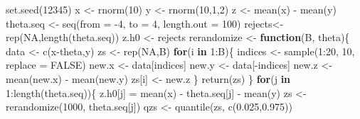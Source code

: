 \documentclass[
]{book}
\newenvironment{Shaded}{\begin{snugshade}}{\end{snugshade}}
\newcommand{\AttributeTok}[1]{\textcolor[rgb]{0.77,0.63,0.00}{#1}}
\newcommand{\ConstantTok}[1]{\textcolor[rgb]{0.00,0.00,0.00}{#1}}
\newcommand{\ControlFlowTok}[1]{\textcolor[rgb]{0.13,0.29,0.53}{\textbf{#1}}}
\newcommand{\DecValTok}[1]{\textcolor[rgb]{0.00,0.00,0.81}{#1}}
\newcommand{\FloatTok}[1]{\textcolor[rgb]{0.00,0.00,0.81}{#1}}
\newcommand{\FunctionTok}[1]{\textcolor[rgb]{0.00,0.00,0.00}{#1}}
\newcommand{\NormalTok}[1]{#1}
\newcommand{\OtherTok}[1]{\textcolor[rgb]{0.56,0.35,0.01}{#1}}
\newcommand{\SpecialCharTok}[1]{\textcolor[rgb]{0.00,0.00,0.00}{#1}}
\theoremstyle{definition}
\theoremstyle{definition}
\theoremstyle{definition}
\theoremstyle{definition}
\theoremstyle{remark}
\begin{document}
\begin{Shaded}
\begin{Highlighting}[]
\FunctionTok{set.seed}\NormalTok{(}\DecValTok{12345}\NormalTok{)}
\NormalTok{x }\OtherTok{\textless{}{-}} \FunctionTok{rnorm}\NormalTok{(}\DecValTok{10}\NormalTok{)}
\NormalTok{y }\OtherTok{\textless{}{-}} \FunctionTok{rnorm}\NormalTok{(}\DecValTok{10}\NormalTok{,}\DecValTok{1}\NormalTok{,}\DecValTok{2}\NormalTok{)}
\NormalTok{z }\OtherTok{\textless{}{-}} \FunctionTok{mean}\NormalTok{(x) }\SpecialCharTok{{-}} \FunctionTok{mean}\NormalTok{(y)}
\NormalTok{theta.seq }\OtherTok{\textless{}{-}} \FunctionTok{seq}\NormalTok{(}\AttributeTok{from =} \SpecialCharTok{{-}}\DecValTok{4}\NormalTok{, }\AttributeTok{to =} \DecValTok{4}\NormalTok{, }\AttributeTok{length.out =} \DecValTok{100}\NormalTok{)}
\NormalTok{rejects}\OtherTok{\textless{}{-}} \FunctionTok{rep}\NormalTok{(}\ConstantTok{NA}\NormalTok{,}\FunctionTok{length}\NormalTok{(theta.seq))}
\NormalTok{z.h0 }\OtherTok{\textless{}{-}}\NormalTok{ rejects}
\NormalTok{rerandomize }\OtherTok{\textless{}{-}} \ControlFlowTok{function}\NormalTok{(B, theta)\{}
\NormalTok{  data }\OtherTok{\textless{}{-}} \FunctionTok{c}\NormalTok{(x}\SpecialCharTok{{-}}\NormalTok{theta,y)}
\NormalTok{  zs }\OtherTok{\textless{}{-}} \FunctionTok{rep}\NormalTok{(}\ConstantTok{NA}\NormalTok{,B)}
  \ControlFlowTok{for}\NormalTok{(i }\ControlFlowTok{in} \DecValTok{1}\SpecialCharTok{:}\NormalTok{B)\{}
\NormalTok{    indices }\OtherTok{\textless{}{-}} \FunctionTok{sample}\NormalTok{(}\DecValTok{1}\SpecialCharTok{:}\DecValTok{20}\NormalTok{, }\DecValTok{10}\NormalTok{, }\AttributeTok{replace =} \ConstantTok{FALSE}\NormalTok{)}
\NormalTok{    new.x }\OtherTok{\textless{}{-}}\NormalTok{ data[indices]}
\NormalTok{    new.y }\OtherTok{\textless{}{-}}\NormalTok{ data[}\SpecialCharTok{{-}}\NormalTok{indices]}
\NormalTok{    new.z }\OtherTok{\textless{}{-}} \FunctionTok{mean}\NormalTok{(new.x) }\SpecialCharTok{{-}} \FunctionTok{mean}\NormalTok{(new.y)}
\NormalTok{    zs[i] }\OtherTok{\textless{}{-}}\NormalTok{ new.z}
\NormalTok{  \}}
\FunctionTok{return}\NormalTok{(zs)}
\NormalTok{\}}
\ControlFlowTok{for}\NormalTok{(j }\ControlFlowTok{in} \DecValTok{1}\SpecialCharTok{:}\FunctionTok{length}\NormalTok{(theta.seq))\{}
\NormalTok{  z.h0[j] }\OtherTok{=} \FunctionTok{mean}\NormalTok{(x) }\SpecialCharTok{{-}}\NormalTok{ theta.seq[j] }\SpecialCharTok{{-}} \FunctionTok{mean}\NormalTok{(y)}
\NormalTok{  zs }\OtherTok{\textless{}{-}} \FunctionTok{rerandomize}\NormalTok{(}\DecValTok{1000}\NormalTok{, theta.seq[j])}
\NormalTok{  qzs }\OtherTok{\textless{}{-}} \FunctionTok{quantile}\NormalTok{(zs, }\FunctionTok{c}\NormalTok{(}\FloatTok{0.025}\NormalTok{,}\FloatTok{0.975}\NormalTok{))  }

\end{Highlighting}
\end{Shaded}
\end{document}
